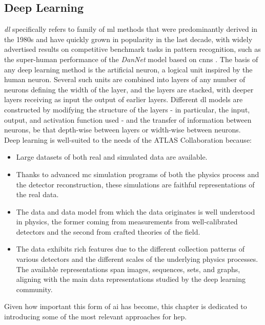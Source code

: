 \subsection{Deep Learning} 
\textit{\gls{dl}} specifically refers to family of \gls{ml} methods that were predominantly derived in the 1980s and have quickly grown in popularity in the last decade, with widely advertised results on competitive benchmark tasks in pattern recognition, such as the super-human performance of the \textit{DanNet} model \cite{DanNet} based on \glspl{cnn} \cite{NIPS198953c3bce6}. The basis of any deep learning method is the artificial neuron, a logical unit inspired by the human neuron. Several such units are combined into layers of any number of neurons defining the width of the layer, and the layers are stacked, with deeper layers receiving as input the output of earlier layers. Different \gls{dl} models are constructed by modifying the structure of the layers - in particular, the input, output, and activation function used - and the transfer of information between neurons, be that depth-wise between layers or width-wise between neurons. \\

Deep learning is well-suited to the needs of the ATLAS Collaboration because:
\begin{itemize}
    \item Large datasets of both real and simulated data are available.
    \item Thanks to advanced \gls{mc} simulation programs of both the physics process and the detector reconstruction, these simulations are faithful representations of the real data.
    \item The data and data model from which the data originates is well understood in physics, the former coming from measurements from well-calibrated detectors and the second from crafted theories of the field. 
    \item The data exhibits rich features due to the different collection patterns of various detectors and the different scales of the underlying physics processes. The available representations span images, sequences, sets, and graphs, aligning with the main data representations studied by the deep learning community.
\end{itemize}
Given how important this form of \gls{ai} has become, this chapter is dedicated to introducing some of the most relevant approaches for \gls{hep}. 

